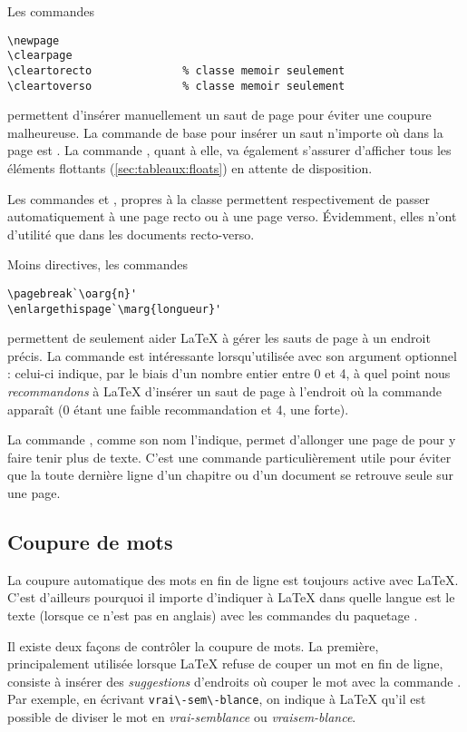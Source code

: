Les commandes
\begin{lstlisting}
\newpage
\clearpage
\cleartorecto              % classe memoir seulement
\cleartoverso              % classe memoir seulement
\end{lstlisting}
permettent d'insérer manuellement un saut de page pour éviter une
coupure malheureuse. La commande de base pour insérer un saut
n'importe où dans la page est \cmd{\newpage}. La commande
\cmd{\clearpage}, quant à elle, va également s'assurer d'afficher tous
les éléments flottants (\autoref{sec:tableaux:floats}) en attente de
disposition.

Les commandes \cmd{\cleartorecto} et \cmd{\cleartoverso}, propres à la
classe  permettent respectivement de passer
automatiquement à une page recto ou à une page verso. Évidemment, elles
n'ont d'utilité que dans les documents recto-verso.

Moins directives, les commandes
\begin{lstlisting}
\pagebreak`\oarg{n}'
\enlargethispage`\marg{longueur}'
\end{lstlisting}
permettent de seulement aider {\LaTeX} à gérer les sauts de page à un
endroit précis. La commande \cmd{\pagebreak} est intéressante
lorsqu'utilisée avec son argument optionnel : celui-ci
indique, par le biais d'un nombre entier entre 0 et 4, à quel point
nous \emph{recommandons} à {\LaTeX} d'insérer un saut de page à
l'endroit où la commande apparaît (0 étant une faible recommandation
et 4, une forte).

La commande \cmd{\enlargethispage}, comme son nom l'indique, permet
d'allonger une page de  pour y faire tenir plus de
texte. C'est une commande particulièrement utile pour éviter que la
toute dernière ligne d'un chapitre ou d'un document se retrouve seule sur
une page.

\subsection{Coupure de mots}
\label{sec:trucs:controle:coupure}

La coupure automatique des mots en fin de ligne est toujours active
avec {\LaTeX}. C'est d'ailleurs pourquoi il importe d'indiquer à
{\LaTeX} dans quelle langue est le texte (lorsque ce n'est pas en
anglais) avec les commandes du paquetage .

Il existe deux façons de contrôler la coupure de mots. La première,
principalement utilisée lorsque {\LaTeX} refuse de couper un mot en
fin de ligne, consiste à insérer des \emph{suggestions} d'endroits où
couper le mot avec la commande \cmd{\-}. Par exemple, en écrivant
\verb=vrai\-sem\-blance=, on indique à {\LaTeX} qu'il est possible de
diviser le mot en \emph{vrai-semblance} ou \emph{vraisem-blance}.

